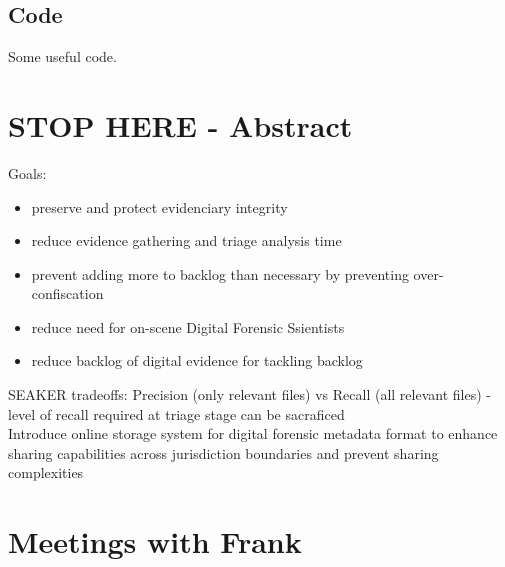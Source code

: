 \documentclass[12pt]{article}
\begin{document}
\subsection{Code}
Some useful code.


\newpage










































\newpage

\section{STOP HERE - Abstract}
\label{sect-abstract}

Goals:
\begin{itemize}
  \item preserve and protect evidenciary integrity
  \item reduce evidence gathering and triage analysis time
  \item prevent adding more to backlog than necessary by preventing over-confiscation
  \item reduce need for on-scene Digital Forensic Ssientists
  \item reduce backlog of digital evidence for tackling backlog
\end{itemize}

SEAKER tradeoffs: Precision (only relevant files) vs Recall (all relevant files)
- level of recall required at triage stage can be sacraficed\\

Introduce online storage system for digital forensic metadata format to enhance sharing capabilities across
jurisdiction boundaries and prevent sharing complexities

\section{Meetings with Frank}
\label{sect-frank}
\vspace{0.5 cm}
\end{document}
